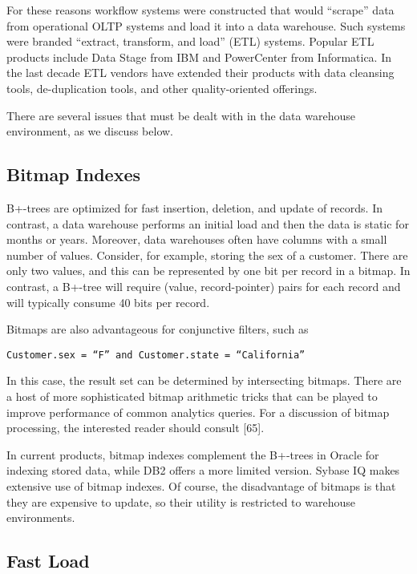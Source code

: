 \documentclass[b5paper,11pt,twoside,openright]{book}
\begin{document}
For these reasons workflow systems were constructed that would
``scrape'' data from operational OLTP systems and load it into a data
warehouse. Such systems were branded ``extract, transform, and load''
(ETL) systems. Popular ETL products include Data Stage from IBM and
PowerCenter from Informatica. In the last decade ETL vendors have
extended their products with data cleansing tools, de-duplication tools,
and other quality-oriented offerings.

There are several issues that must be dealt with in the data warehouse
environment, as we discuss below.

\hypertarget{bitmap-indexes}{%
\subsection{Bitmap Indexes}\label{bitmap-indexes}}

B+-trees are optimized for fast insertion, deletion, and update of
records. In contrast, a data warehouse performs an initial load and then
the data is static for months or years. Moreover, data warehouses often
have columns with a small number of values. Consider, for example,
storing the sex of a customer. There are only two values, and this can
be represented by one bit per record in a bitmap. In contrast, a B+-tree
will require (value, record-pointer) pairs for each record and will
typically consume 40 bits per record.

Bitmaps are also advantageous for conjunctive filters, such as\\

\centerline{\texttt{Customer.sex = ``F'' and Customer.state = ``California''}}

In this case, the result set can be determined by intersecting bitmaps.
There are a host of more sophisticated bitmap arithmetic tricks that can
be played to improve performance of common analytics queries. For a
discussion of bitmap processing, the interested reader should consult
{[}65{]}.

In current products, bitmap indexes complement the B+-trees in Oracle
for indexing stored data, while DB2 offers a more limited version.
Sybase IQ makes extensive use of bitmap indexes. Of course, the
disadvantage of bitmaps is that they are expensive to update, so their
utility is restricted to warehouse environments.

\hypertarget{fast-load}{%
\subsection{Fast Load}\label{fast-load}}
\end{document}
